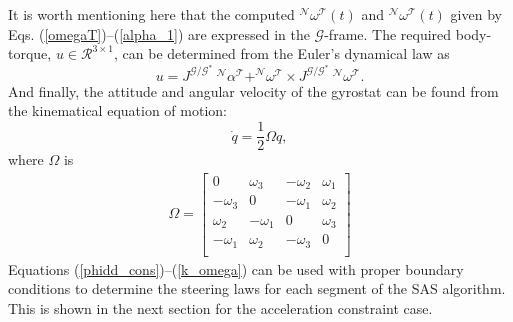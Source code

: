 \documentclass[letterpaper, paper,12pt]{AAS}		%
\begin{document}
It is worth mentioning here that the computed $^\mathcal{N}\omega^\mathcal{T}(t)$ and $^\mathcal{N}\omega^\mathcal{T}(t)$  given by Eqs. (\ref{omegaT})--(\ref{alpha_1}) are expressed in the $\mathcal{G}$-frame. The required body-torque, $u\in\mathcal{R}^{3\times 1}$, can be determined from the Euler's dynamical law as 
\begin{equation} \label{Euler_RBD}
u=J^{\mathcal{G/G^*}}\ ^\mathcal{N}\alpha^\mathcal{T} + ^\mathcal{N}\omega^\mathcal{T} \times J^{\mathcal{G/G^*}}\ ^\mathcal{N}\omega^\mathcal{T}.
\end{equation} 
And finally, the attitude and angular velocity of the gyrostat can be found from the kinematical equation of motion: 
\begin{equation} \label{kinematics}
\dot{q} = \frac{1}{2} \Omega q, 
\end{equation}
where $\Omega$ is 
\begin{gather} \label{k_omega}
\Omega =
\begin{bmatrix}
0 & \omega_3 & -\omega_2 & \omega_1 \\
-\omega_3 & 0 & -\omega_1 & \omega_2 \\
\omega_2 & -\omega_1 & 0 & \omega_3 \\ 
-\omega_1 & \omega_2 & -\omega_3 & 0 \\ 
\end{bmatrix}
\end{gather}
%
%
%
%
%
Equations (\ref{phidd_cons})--(\ref{k_omega}) can be used with proper boundary conditions to determine the steering laws for each segment of the SAS algorithm. This is shown in the next section for the acceleration constraint case.
	
\end{document}
